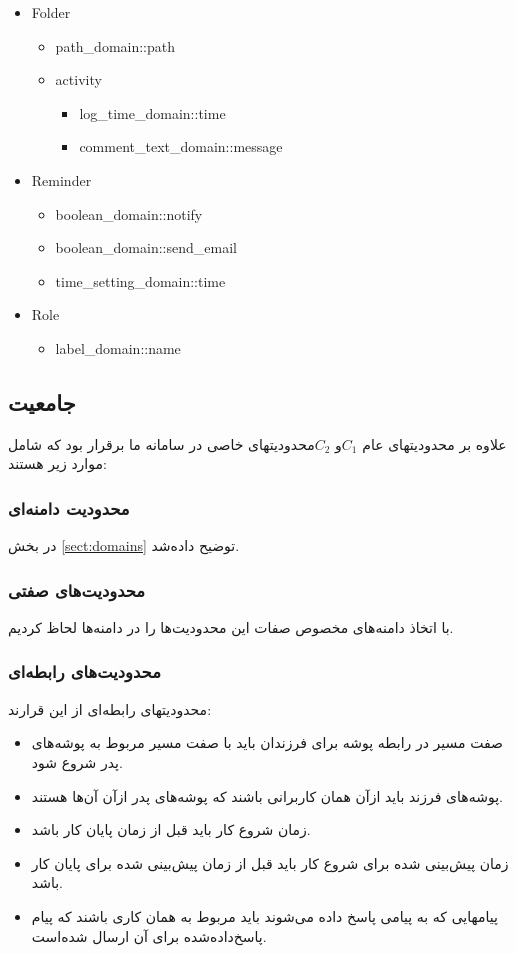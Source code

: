 \documentclass{article}
\begin{document}
\begin{itemize}
\item Folder
	\begin{itemize}
	\item path\_domain::path
	\item activity	
		\begin{itemize}
		\item log\_time\_domain::time
		\item comment\_text\_domain::message
		\end{itemize}
	\end{itemize}
\item Reminder
	\begin{itemize}
	\item boolean\_domain::notify
	\item boolean\_domain::send\_email
	\item time\_setting\_domain::time
	\end{itemize}
\item Role
	\begin{itemize}
	\item label\_domain::name
	\end{itemize}
\end{itemize}
\persian
\subsection*{جامعیت}
علاوه بر محدودیتهای عام $C_1 $و $ C_2$محدودیتهای خاصی در سامانه ما برقرار بود که شامل موارد زیر هستند:
\subsubsection*{محدودیت دامنه‌ای}
در بخش 
\ref{sect:domains}
توضیح داده‌شد.
\subsubsection*{محدودیت‌های صفتی}
با اتخاذ دامنه‌های مخصوص صفات این محدودیت‌ها را در دامنه‌ها لحاظ کردیم.
\subsubsection*{محدودیت‌های رابطه‌ای}
محدودیتهای رابطه‌ای از این قرارند:
\begin{itemize}
\item
صفت مسیر
  در رابطه پوشه
    برای فرزندان باید با صفت مسیر مربوط به پوشه‌های پدر شروع شود. 
\item
پوشه‌های فرزند باید ازآن همان کاربرانی باشند که پوشه‌های پدر ازآن آن‌ها هستند. 
\item
زمان شروع کار
 باید قبل از زمان پایان کار باشد. 
\item
زمان پیش‌بینی شده برای شروع کار باید قبل از زمان پیش‌بینی شده برای پایان کار باشد. 
\item
پیامهایی که به پیامی پاسخ داده می‌شوند باید مربوط به همان کاری باشند که پیام پاسخ‌داده‌شده برای آن ارسال شده‌است. 
\end{itemize}
\end{document}
